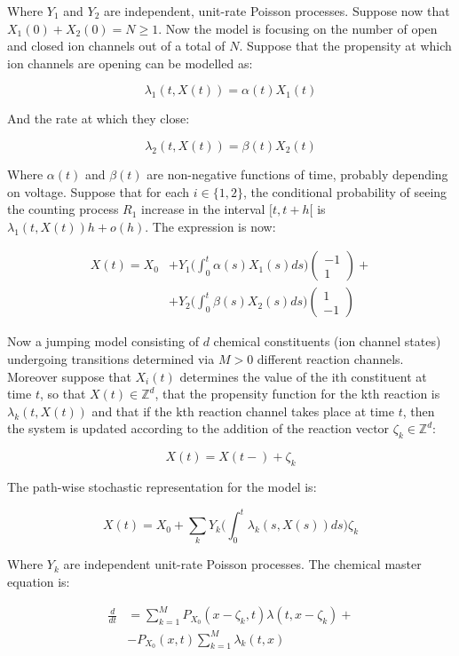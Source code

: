 	Where $Y_1$ and $Y_2$ are independent, unit-rate Poisson processes.
	Suppose now that $X_1(0) + X_2(0) = N\ge 1$.
	Now the model is focusing on the number of open and closed ion channels out of a total of $N$.
	Suppose that the propensity at which ion channels are opening can be modelled as:

	$$\lambda_1(t, X(t)) = \alpha(t)X_1(t)$$

	And the rate at which they close:

	$$\lambda_2(t, X(t)) = \beta(t)X_2(t)$$

	Where $\alpha(t)$ and $\beta(t)$ are non-negative functions of time, probably depending on voltage.
	Suppose that for each $i\in\{1, 2\}$, the conditional probability of seeing the counting process $R_1$ increase in the interval $[t, t+h[$ is $\lambda_1(t, X(t))h+o(h)$.
	The expression is now:

	\begin{align*}
		X(t) = X_0 &+ Y_1\biggl(\int_0^t\alpha(s)X_1(s)ds\biggr)\begin{pmatrix}-1\\1\end{pmatrix} +\\
							 &+Y_2\biggl(\int_0^t\beta(s)X_2(s)ds\biggr)\begin{pmatrix}1\\-1\end{pmatrix}
	\end{align*}

	Now a jumping model consisting of $d$ chemical constituents (ion channel states) undergoing transitions determined via $M>0$ different reaction channels.
	Moreover suppose that $X_i(t)$ determines the value of the ith constituent at time $t$, so that $X(t)\in\mathbb{Z}^{d}$, that the propensity function for the kth reaction is $\lambda_k(t, X(t))$ and that if the kth reaction channel takes place at time $t$, then the system is updated according to the addition of the reaction vector $\zeta_k\in\mathbb{Z}^d$:

	$$X(t) = X(t-)+\zeta_k$$

	The path-wise stochastic representation for the model is:

	$$X(t) = X_0 + \sum\limits_kY_k\biggl(\int_0^t\lambda_k(s, X(s))ds\biggr)\zeta_k$$

	Where $Y_k$ are independent unit-rate Poisson processes.
	The chemical master equation is:

	\begin{align*}
		\frac{d}{dt} &= \sum\limits_{k=1}^MP_{X_0}(x-\zeta_k, t)\lambda(t, x-\zeta_k)+\\
								 &-P_{X_0}(x, t)\sum\limits_{k=1}^M\lambda_k(t, x)
	\end{align*}

